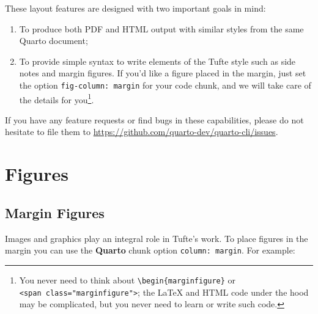\documentclass[
  letterpaper,
  DIV=11,
  numbers=noendperiod,
  oneside]{scrartcl}
\newenvironment{Shaded}{\begin{snugshade}}{\end{snugshade}}
\newcommand{\AttributeTok}[1]{\textcolor[rgb]{0.40,0.45,0.13}{#1}}
\newcommand{\FunctionTok}[1]{\textcolor[rgb]{0.28,0.35,0.67}{#1}}
\newcommand{\NormalTok}[1]{\textcolor[rgb]{0.00,0.23,0.31}{#1}}
\newcommand{\OtherTok}[1]{\textcolor[rgb]{0.00,0.23,0.31}{#1}}
\newcommand{\SpecialCharTok}[1]{\textcolor[rgb]{0.37,0.37,0.37}{#1}}
\newcommand{\StringTok}[1]{\textcolor[rgb]{0.13,0.47,0.30}{#1}}
\providecommand{\tightlist}{%
  \setlength{\itemsep}{0pt}\setlength{\parskip}{0pt}}\usepackage{longtable,booktabs,array}
\begin{document}
These layout features are designed with two important goals in mind:

\begin{enumerate}
\def\labelenumi{\arabic{enumi}.}
\tightlist
\item
  To produce both PDF and HTML output with similar styles from the same
  Quarto document;
\item
  To provide simple syntax to write elements of the Tufte style such as
  side notes and margin figures. If you'd like a figure placed in the
  margin, just set the option \texttt{fig-column:\ margin} for your code
  chunk, and we will take care of the details for you\footnote{You never
    need to think about \texttt{\textbackslash{}begin\{marginfigure\}}
    or \texttt{\textless{}span\ class="marginfigure"\textgreater{}}; the
    LaTeX and HTML code under the hood may be complicated, but you never
    need to learn or write such code.}.
\end{enumerate}

If you have any feature requests or find bugs in these capabilities,
please do not hesitate to file them to
\url{https://github.com/quarto-dev/quarto-cli/issues}.

\section{Figures}\label{figures}

\subsection{Margin Figures}\label{margin-figures}

Images and graphics play an integral role in Tufte's work. To place
figures in the margin you can use the \textbf{Quarto} chunk option
\texttt{column:\ margin}. For example:

\begin{Shaded}
\end{Shaded}
\end{document}
